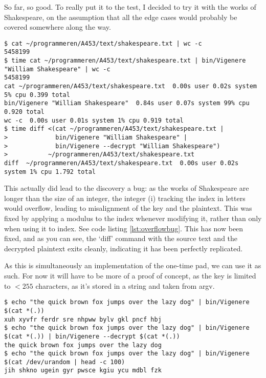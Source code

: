 \documentclass{article}
\begin{document}
    So far, so good. To really put it to the test, I decided to try it with the
    works of Shakespeare, on the assumption that all the edge cases would
    probably be covered somewhere along the way.

\begin{lstlisting}[caption=Shakespeare]
$ cat ~/programmeren/A453/text/shakespeare.txt | wc -c                                          
5458199
$ time cat ~/programmeren/A453/text/shakespeare.txt | bin/Vigenere "William Shakespeare" | wc -c
5458199
cat ~/programmeren/A453/text/shakespeare.txt  0.00s user 0.02s system 5% cpu 0.399 total
bin/Vigenere "William Shakespeare"  0.84s user 0.07s system 99% cpu 0.920 total
wc -c  0.00s user 0.01s system 1% cpu 0.919 total
$ time diff <(cat ~/programmeren/A453/text/shakespeare.txt |
>             bin/Vigenere "William Shakespeare" |
>             bin/Vigenere --decrypt "William Shakespeare")
>           ~/programmeren/A453/text/shakespeare.txt 
diff  ~/programmeren/A453/text/shakespeare.txt  0.00s user 0.02s system 1% cpu 1.792 total
\end{lstlisting}
\iffalse $ \fi %

    This actually did lead to the discovery a bug: as the works of Shakespeare
    are longer than the size of an integer, the integer (i) tracking the index
    in letters would overflow, leading to misalignment of the key and the
    plaintext. This was fixed by applying a modulus to the index whenever
    modifying it, rather than only when using it to index. See code listing
    \ref{lst:overflowbug}. This has now been fixed, and as you can see, the
    `diff' command with the source text and the decrypted plaintext exits
    cleanly, indicating it has been perfectly replicated.

    As this is simultaneously an implementation of the one-time pad, we can use
    it as such. For now it will have to be more of a proof of concept, as the
    key is limited to $< 255$ characters, as it's stored in a string and taken
    from argv.

\begin{lstlisting}[caption=Using the Vigen\`ere program for a one-time pad]
$ echo "the quick brown fox jumps over the lazy dog" | bin/Vigenere $(cat *(.))
xuh xyvfr ferdr sre nhpww bylv gkl pncf hbj
$ echo "the quick brown fox jumps over the lazy dog" | bin/Vigenere $(cat *(.)) | bin/Vigenere --decrypt $(cat *(.))
the quick brown fox jumps over the lazy dog
$ echo "the quick brown fox jumps over the lazy dog" | bin/Vigenere $(cat /dev/urandom | head -c 100)
jih shkno ugein gyr pwsce kgiu ycu mdbl fzk
\end{lstlisting}
\iffalse $ \fi %
\end{document}
